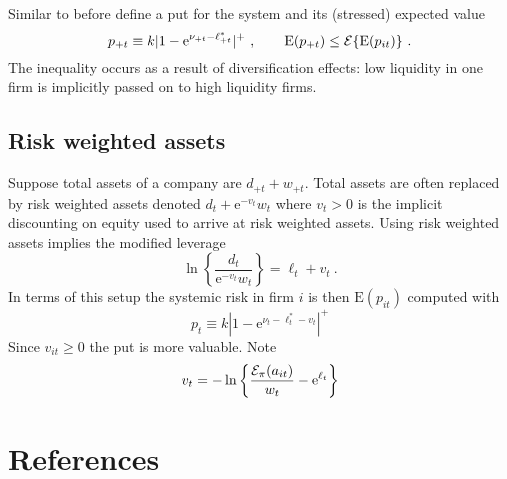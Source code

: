 \documentclass[authoryear]{elsarticle}
\newcommand{\E}{\mathrm{E}}
\newcommand{\e}{\mathrm{e}}
\newcommand{\Ex}{{\cal E}}
\newcommand{\cq}{\ , \qquad}
\begin{document}
Similar to before define a put for the system and its (stressed) expected value
$$
p_{+t}\equiv k|1-\e^{\nu_{+t}-\ell_{+t}^*}|^+\cq \E(p_{+t})\le\Ex\{\E(p_{it})\}\ .
$$
The inequality occurs as a result  of diversification effects:   low liquidity  in one firm is implicitly passed on to high liquidity  firms.

\subsection{Risk weighted assets}

Suppose total assets of a company are $d_{+t}+w_{+t}$.   Total assets are often replaced by  risk weighted assets denoted $d_t+\e^{-v_t}w_t$ where $v_t>0$ is the implicit discounting on equity used to arrive at risk weighted assets.  
  Using risk weighted assets implies the modified leverage
$$
 \ln\left\{ \frac{d_t}{\e^{-v_t}w_t}\right\}=\ell_t +v_t\ .
$$
In terms of this setup the systemic risk in firm $i$ is then $\E(p_{it})$ computed with 
$$
p_{t}\equiv  k|1-\e^{\nu_{t}-\ell^*_{t}-v_t}|^+
$$
Since $v_{it}\ge 0$ the put is more valuable.   Note 
$$
v_t =-\ln\left\{ \frac{\Ex_\pi(a_{it})}{w_t} - \e^{\ell_t}\right\}
$$

\section*{References}

\end{document}
